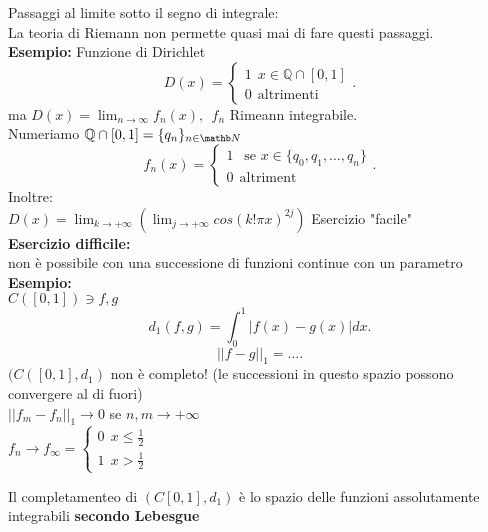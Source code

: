 \documentclass[12px]{article}
\begin{document}
	 Passaggi al limite sotto il segno di integrale:\\
	 La teoria di Riemann non permette quasi mai di fare questi passaggi. \\
	 \textbf{Esempio:} Funzione di Dirichlet\\
	 \[
	 D(x) = \begin{cases}
		 1 \ \ x\in\mathbb Q\cap [0,1]\\
		 0 \ \ \text{altrimenti}
	 \end{cases}
 .\]
 ma $D(x) = \lim_{n \rightarrow\infty} f_n(x), \ \ f_n$ Rimeann integrabile.\\
 Numeriamo $\mathbb Q\cap [0,1] = \{q_n\}_{n\in\mathb N}$\\
 \[
 f_n(x) = \begin{cases}
	 1 \ \ \text{ se } x\in\{q_0,q_1,\ldots,q_n\}\\
	 0 \ \ \text{altriment}
 \end{cases}
 .\] 
 Inoltre:\\
 $D(x) = \lim_{k \rightarrow +\infty} \left(\lim_{j \rightarrow +\infty} cos(k!\pi x)^{2j} \right)$ Esercizio "facile"\\
 \textbf{Esercizio difficile:}\\
 non è possibile con una successione di funzioni continue con un parametro\\
 \textbf{Esempio:}\\
 $C([0,1])\ni f,g$\\
 \[
 d_1(f,g) = \int_0^1|f(x)-g(x)|dx
 .\] 
 \[
 ||f-g||_1 = \ldots
 .\] 
 $(C([0,1],d_1)$ non è completo! (le successioni in questo spazio possono convergere al di fuori)\\
 $||f_m - f_n||_1 \rightarrow 0 $ se $n,m \rightarrow + \infty$\\
 $f_n \rightarrow f_\infty = \begin{cases}
 	0 \ \ x\leq \frac 12\\
	1 \ \ x > \frac 12
 \end{cases}$
 \begin{teo}
	 Il completamenteo di $(C[0,1],d_1)$ è lo spazio delle funzioni assolutamente integrabili \textbf{secondo Lebesgue}
 \end{teo}
\end{document}
